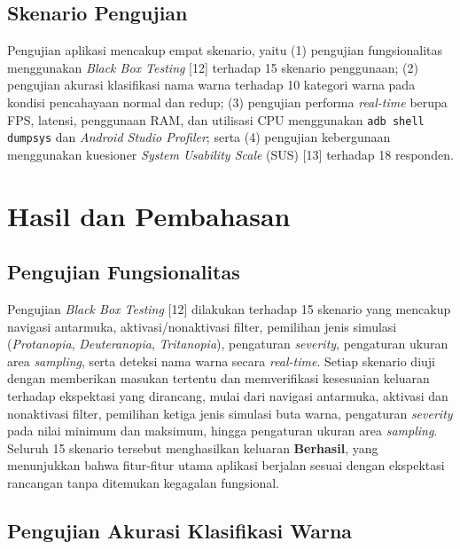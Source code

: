 \subsection{Skenario Pengujian}

Pengujian aplikasi mencakup empat skenario, yaitu (1) pengujian fungsionalitas menggunakan \textit{Black Box Testing} [12] terhadap 15 skenario penggunaan; (2) pengujian akurasi klasifikasi nama warna terhadap 10 kategori warna pada kondisi pencahayaan normal dan redup; (3) pengujian performa \textit{real-time} berupa FPS, latensi, penggunaan RAM, dan utilisasi CPU menggunakan \texttt{adb shell dumpsys} dan \textit{Android Studio Profiler}; serta (4) pengujian kebergunaan menggunakan kuesioner \textit{System Usability Scale} (SUS) [13] terhadap 18 responden.

\section{Hasil dan Pembahasan}

\subsection{Pengujian Fungsionalitas}

Pengujian \textit{Black Box Testing} [12] dilakukan terhadap 15 skenario yang mencakup navigasi antarmuka, aktivasi/nonaktivasi filter, pemilihan jenis simulasi (\textit{Protanopia}, \textit{Deuteranopia}, \textit{Tritanopia}), pengaturan \textit{severity}, pengaturan ukuran area \textit{sampling}, serta deteksi nama warna secara \textit{real-time}. Setiap skenario diuji dengan memberikan masukan tertentu dan memverifikasi kesesuaian keluaran terhadap ekspektasi yang dirancang, mulai dari navigasi antarmuka, aktivasi dan nonaktivasi filter, pemilihan ketiga jenis simulasi buta warna, pengaturan \textit{severity} pada nilai minimum dan maksimum, hingga pengaturan ukuran area \textit{sampling}. Seluruh 15 skenario tersebut menghasilkan keluaran \textbf{Berhasil}, yang menunjukkan bahwa fitur-fitur utama aplikasi berjalan sesuai dengan ekspektasi rancangan tanpa ditemukan kegagalan fungsional.

\subsection{Pengujian Akurasi Klasifikasi Warna}

